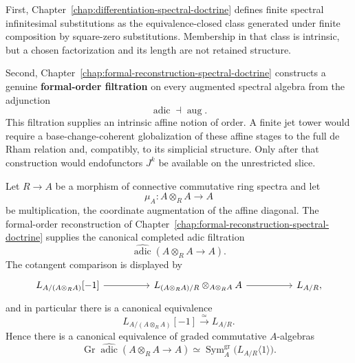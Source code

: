 First, Chapter~\ref{chap:differentiation-spectral-doctrine} defines finite
spectral infinitesimal substitutions as the equivalence-closed class generated
under finite composition by square-zero substitutions. Membership in that
class is intrinsic, but a chosen factorization and its length are not retained
structure.

Second, Chapter~\ref{chap:formal-reconstruction-spectral-doctrine} constructs
a genuine \textbf{formal-order filtration} on every augmented spectral algebra
from the adjunction
\[
  \operatorname{adic}\dashv\operatorname{aug}.
\]
This filtration supplies an intrinsic affine notion of order. A finite jet
tower would require a base-change-coherent globalization of these affine stages
to the full de Rham relation and, compatibly, to its simplicial structure.
Only after that construction would endofunctors \(J^k\) be available on the
unrestricted slice.

\begin{proposition}
\label{prop:affine-diagonal-formal-order}
Let \(R\to A\) be a morphism of connective commutative ring spectra and let
\[
  \mu_A:A\otimes_RA\longrightarrow A
\]
be multiplication, the coordinate augmentation of the affine diagonal. The
formal-order reconstruction of
Chapter~\ref{chap:formal-reconstruction-spectral-doctrine} supplies the
canonical completed adic filtration
\[
  \widehat{\operatorname{adic}}(A\otimes_RA\to A).
\]
The cotangent comparison is displayed by
\[
\begin{tikzcd}[column sep=huge,row sep=large]
L_{A/(A\otimes_RA)}[-1]
  \ar[r]
&
L_{(A\otimes_RA)/R}\otimes_{A\otimes_RA}A
  \ar[r]
&
L_{A/R},
\end{tikzcd}
\]
and in particular there is a canonical equivalence
\[
  L_{A/(A\otimes_RA)}[-1]
  \xrightarrow{\simeq}
  L_{A/R}.
\]
Hence there is a canonical equivalence of graded commutative \(A\)-algebras
\[
  \operatorname{Gr}
  \widehat{\operatorname{adic}}(A\otimes_RA\to A)
  \simeq
  \operatorname{Sym}^{\mathrm{gr}}_A
  \bigl(L_{A/R}\langle1\rangle\bigr).
\]
\end{proposition}

